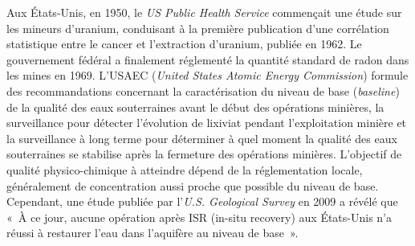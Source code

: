 \documentclass{article}
\begin{document}
Aux États-Unis, en 1950, le \textit{US Public Health Service} commençait une étude sur les mineurs d'uranium, conduisant à la première publication d'une corrélation statistique entre le cancer et l'extraction d'uranium, publiée en 1962. Le gouvernement fédéral a finalement réglementé la quantité standard de radon dans les mines en 1969. %
L'USAEC (\textit{United States Atomic Energy Commission}) formule des recommandations concernant la caractérisation du niveau de base (\textit{baseline}) de la qualité des eaux souterraines avant le début des opérations minières, la surveillance pour détecter l’évolution de lixiviat pendant l'exploitation minière et la surveillance à long terme pour déterminer à quel moment la qualité des eaux souterraines se stabilise après la fermeture des opérations minières.
L'objectif de qualité physico-chimique à atteindre dépend de la réglementation locale, généralement de concentration aussi proche que possible du niveau de base.
Cependant, une étude publiée par l'\textit{U.S. Geological Survey} en 2009 a révélé que «~À ce jour, aucune opération après ISR (in-situ recovery) aux États-Unis n'a réussi à restaurer l'eau dans l'aquifère au niveau de base~».
\end{document}
